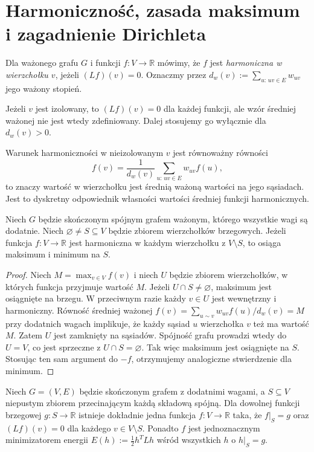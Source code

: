\section{Harmoniczność, zasada maksimum i zagadnienie Dirichleta}
\label{sec:tg-harmonic}

\begin{definicja}
Dla ważonego grafu $G$ i funkcji $f:V\to\mathbb R$
mówimy, że $f$ jest \emph{harmoniczna w wierzchołku $v$},
jeżeli $(Lf)(v)=0$. Oznaczmy przez $d_w(v):=\sum_{u:\,uv\in E}w_{uv}$
jego ważony stopień.
\end{definicja}

Jeżeli $v$ jest izolowany, to $(Lf)(v)=0$ dla każdej funkcji,
ale wzór średniej ważonej nie jest wtedy zdefiniowany.
Dalej stosujemy go wyłącznie dla $d_w(v)>0$.

Warunek harmoniczności w nieizolowanym $v$ jest równoważny równości
\[
f(v)=\frac{1}{d_w(v)}\sum_{u:\,uv\in E}w_{uv}f(u),
\]
to znaczy wartość w wierzchołku jest średnią ważoną wartości
na jego sąsiadach. Jest to dyskretny odpowiednik
własności wartości średniej funkcji harmonicznych.

\begin{twierdzenie}
Niech $G$ będzie skończonym spójnym grafem ważonym, którego
wszystkie wagi są dodatnie. Niech $\varnothing\ne S\subseteq V$
będzie zbiorem wierzchołków brzegowych. Jeżeli funkcja
$f:V\to\mathbb R$ jest harmoniczna w każdym wierzchołku
z $V\setminus S$, to osiąga maksimum i minimum na $S$.
\end{twierdzenie}

\begin{proof}
Niech $M=\max_{v\in V}f(v)$ i niech $U$ będzie zbiorem
wierzchołków, w których funkcja przyjmuje wartość $M$.
Jeżeli $U\cap S\ne\varnothing$, maksimum jest osiągnięte
na brzegu. W przeciwnym razie każdy $v\in U$ jest
wewnętrzny i harmoniczny. Równość średniej ważonej
$f(v)=\sum_{u\sim v}w_{uv}f(u)/d_w(v)=M$ przy dodatnich wagach
implikuje, że każdy sąsiad $u$ wierzchołka $v$ też ma
wartość $M$. Zatem $U$ jest zamknięty na sąsiadów.
Spójność grafu prowadzi wtedy do $U=V$, co jest
sprzeczne z $U\cap S=\varnothing$.
Tak więc maksimum jest osiągnięte na $S$.
Stosując ten sam argument do $-f$, otrzymujemy
analogiczne stwierdzenie dla minimum.
\end{proof}

\begin{twierdzenie}
\label{thm:tg-dirichlet}
Niech $G=(V,E)$ będzie skończonym grafem z dodatnimi
wagami, a $S\subseteq V$ niepustym zbiorem przecinającym
każdą składową spójną. Dla dowolnej funkcji brzegowej
$g:S\to\mathbb R$ istnieje dokładnie jedna funkcja
$f:V\to\mathbb R$ taka, że $f|_S=g$ oraz
$(Lf)(v)=0$ dla każdego $v\in V\setminus S$.
Ponadto $f$ jest jednoznacznym minimizatorem energii
$E(h):=\tfrac12 h^TLh$ wśród wszystkich $h$ o $h|_S=g$.
\end{twierdzenie}

